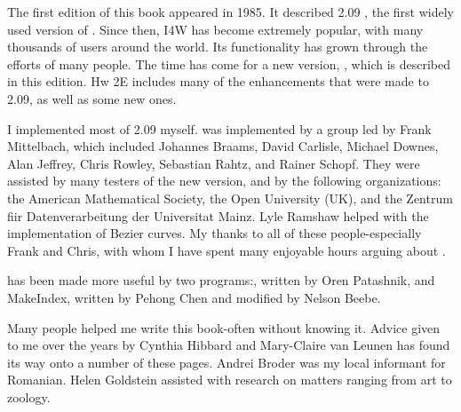 The first edition of this book appeared in 1985. It described \ltx{} 2.09 , the first widely 
used version of \ltx{}. Since then, I4W has become extremely popular, with many thousands of users 
around the world. Its functionality has grown through the efforts of many people. The time has come for a new version,
\ltxee{}, which is described in this edition. Hw 2E includes many of the enhancements that were made to \ltx{} 2.09, 
as well as some new ones.



I implemented most of \ltx{} 2.09 myself. was implemented by a group led by Frank Mittelbach, 
which included Johannes Braams, David Carlisle, Michael Downes, Alan Jeffrey, Chris Rowley, 
Sebastian Rahtz, and Rainer Schopf. They were assisted by many testers of the new version, and by
the following organizations: the American Mathematical Society, the Open University (UK), and the 
Zentrum fiir Datenverarbeitung der Universitat Mainz. Lyle Ramshaw helped with the implementation 
of Bezier curves. My thanks to all of these people-especially Frank and Chris, with whom I have spent many
enjoyable hours arguing about \ltx{}. 

\ltx{} has been made more useful by two programs:, written by Oren Patashnik, and MakeIndex, 
written by Pehong Chen and modified by Nelson Beebe.

Many people helped me write this book-often without knowing it. Advice
given to me over the years by Cynthia Hibbard and Mary-Claire van Leunen
has found its way onto a number of these pages. Andrei Broder was my local
informant for Romanian. Helen Goldstein assisted with research on matters
ranging from art to zoology.

